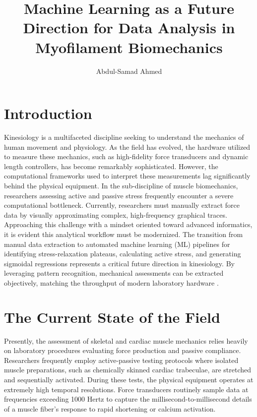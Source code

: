 \documentclass[jou]{apa7}
\title{Machine Learning as a Future Direction for Data Analysis in Myofilament Biomechanics}
\author{Abdul-Samad Ahmed}
\affiliation{University of Calgary}
\begin{document}
\maketitle

\section{Introduction}

Kinesiology is a multifaceted discipline seeking to understand the mechanics of human movement and physiology. As the field has evolved, the hardware utilized to measure these mechanics, such as high-fidelity force transducers and dynamic length controllers, has become remarkably sophisticated. However, the computational frameworks used to interpret these measurements lag significantly behind the physical equipment. In the sub-discipline of muscle biomechanics, researchers assessing active and passive stress frequently encounter a severe computational bottleneck. Currently, researchers must manually extract force data by visually approximating complex, high-frequency graphical traces. Approaching this challenge with a mindset oriented toward advanced informatics, it is evident this analytical workflow must be modernized. The transition from manual data extraction to automated machine learning (ML) pipelines for identifying stress-relaxation plateaus, calculating active stress, and generating sigmoidal regressions represents a critical future direction in kinesiology. By leveraging pattern recognition, mechanical assessments can be extracted objectively, matching the throughput of modern laboratory hardware \parencite{Lee2025,Aboelkassem2025}. 

\section{The Current State of the Field}

Presently, the assessment of skeletal and cardiac muscle mechanics relies heavily on laboratory procedures evaluating force production and passive compliance. Researchers frequently employ active-passive testing protocols where isolated muscle preparations, such as chemically skinned cardiac trabeculae, are stretched and sequentially activated. During these tests, the physical equipment operates at extremely high temporal resolutions. Force transducers routinely sample data at frequencies exceeding 1000 Hertz to capture the millisecond-to-millisecond details of a muscle fiber’s response to rapid shortening or calcium activation.
\end{document}
